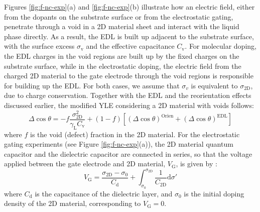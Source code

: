 \documentclass[journal=langd5,manuscript=article,email=true,hyperref=true,keywords=true]{achemso}
\begin{document}
Figures \ref{fig:f-nc-exp}(a) and \ref{fig:f-nc-exp}(b) illustrate how
an electric field, either from the dopants on the substrate surface or
from the electrostatic gating, penetrate through a void in a 2D
material sheet and interact with the liquid phase directly. As a
result, the EDL is built up adjacent to the substrate surface, with
the surface excess \(\sigma_{\mathrm{v}}\) and the effective
capacitance \(C_{\mathrm{v}}\).  For molecular doping, the EDL charges
in the void regions are built up by the fixed charges on the substrate
surface, while in the electrostatic doping, the electric field from
the charged 2D material to the gate electrode through the void regions
is responsible for building up the EDL. For both cases, we assume that
\(\sigma_{v}\) is equivalent to \(\sigma_{\mathrm{2D}}\), due to
charge conservation. Together with the EDL and the reorientation
effects discussed earlier, the modified YLE considering a 2D material
with voids follows:
\begin{equation}
\label{eqn-def-Delta-cos-mixture}
\Delta \cos \theta = -f\frac{\sigma_{\mathrm{2D}}^{2}}{\gamma_{\mathrm{L}} C_{\mathrm{v}}} 
                     + (1-f)[(\Delta \cos \theta)^{\mathrm{Orien}} + (\Delta \cos \theta)^{\mathrm{EDL}}]
\end{equation}
where \(f\) is the void (defect) fraction in the 2D material. For the
electrostatic gating experiments (see Figure
\ref{fig:f-nc-exp}(a)), the 2D material quantum capacitor
and the dielectric  capacitor are connected in
series, so that the voltage applied between the gate electrode and
2D material, \(V_{\mathrm{G}}\), is given by \cite{tian_multiscale_2016}:
\begin{equation}
\label{eqn-VG-gating}
V_{\mathrm{G}} = \frac{\sigma_{\mathrm{2D}} - \sigma_{\mathrm{0}}}{C_{\mathrm{d}}}
                  + \int_{\sigma_{0}}^{\sigma_{\mathrm{2D}}} \frac{1}{C_{\mathrm{2D}}} \mathrm{d}\sigma'
\end{equation}
where \(C_{\mathrm{d}}\) is the capacitance of the dielectric layer, and
\(\sigma_{0}\) is the initial doping density of the 2D material,
corresponding to \(V_{\mathrm{G}}=0\).
\end{document}
